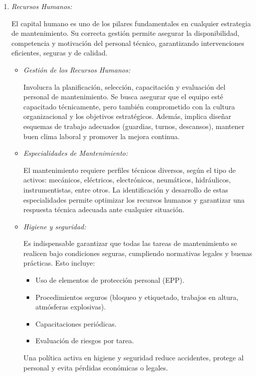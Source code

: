 \documentclass[a4paper,oneside,11pt]{article}
\begin{document}
\begin{enumerate}
    \item \textit{Recursos Humanos:}

    El capital humano es uno de los pilares fundamentales en cualquier estrategia de mantenimiento. Su correcta gestión permite asegurar la disponibilidad, competencia y motivación del personal técnico, garantizando intervenciones eficientes, seguras y de calidad.

    \begin{itemize}
        \item \textit{Gestión de los Recursos Humanos:}
        
        Involucra la planificación, selección, capacitación y evaluación del personal de mantenimiento. Se busca asegurar que el equipo esté capacitado técnicamente, pero también comprometido con la cultura organizacional y los objetivos estratégicos. Además, implica diseñar esquemas de trabajo adecuados (guardias, turnos, descansos), mantener buen clima laboral y promover la mejora continua.
        
        \item \textit{Especialidades de Mantenimiento:}

        El mantenimiento requiere perfiles técnicos diversos, según el tipo de activos: mecánicos, eléctricos, electrónicos, neumáticos, hidráulicos, instrumentistas, entre otros. La identificación y desarrollo de estas especialidades permite optimizar los recursos humanos y garantizar una respuesta técnica adecuada ante cualquier situación.
        
        \item \textit{Higiene y seguridad:}

        Es indispensable garantizar que todas las tareas de mantenimiento se realicen bajo condiciones seguras, cumpliendo normativas legales y buenas prácticas. Esto incluye:

        \begin{itemize}
            \item Uso de elementos de protección personal (EPP).
            \item Procedimientos seguros (bloqueo y etiquetado, trabajos en altura, atmósferas explosivas).
            \item Capacitaciones periódicas.
            \item Evaluación de riesgos por tarea.
        \end{itemize}

        Una política activa en higiene y seguridad reduce accidentes, protege al personal y evita pérdidas económicas o legales.
    \end{itemize}


\end{enumerate}
\end{document}
